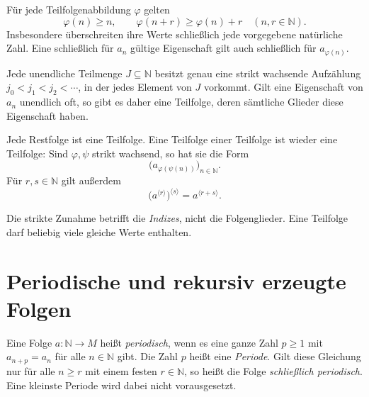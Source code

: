 \begin{theorem}
\label{b21guide:thm:indices}
Für jede Teilfolgenabbildung $\varphi$ gelten
\[
 \varphi(n)\geq n,\qquad
 \varphi(n+r)\geq\varphi(n)+r
 \quad(n,r\in\mathbb N).
\]
Insbesondere überschreiten ihre Werte schließlich jede vorgegebene
natürliche Zahl. Eine schließlich für $a_n$ gültige Eigenschaft
gilt auch schließlich für $a_{\varphi(n)}$.
\end{theorem}

\begin{theorem}
\label{b21guide:thm:enumeration}
Jede unendliche Teilmenge $J\subseteq\mathbb N$ besitzt genau
eine strikt wachsende Aufzählung
$j_0<j_1<j_2<\cdots$, in der jedes Element von $J$ vorkommt.
Gilt eine Eigenschaft von $a_n$ unendlich oft, so gibt es daher
eine Teilfolge, deren sämtliche Glieder diese Eigenschaft haben.
\end{theorem}

\begin{theorem}
Jede Restfolge ist eine Teilfolge. Eine Teilfolge einer Teilfolge
ist wieder eine Teilfolge: Sind $\varphi,\psi$ strikt wachsend,
so hat sie die Form
\[
 \bigl(a_{\varphi(\psi(n))}\bigr)_{n\in\mathbb N}.
\]
Für $r,s\in\mathbb N$ gilt außerdem
\[
 \bigl(a^{\langle r\rangle}\bigr)^{\langle s\rangle}
 =a^{\langle r+s\rangle}.
\]
\end{theorem}

Die strikte Zunahme betrifft die \emph{Indizes}, nicht die
Folgenglieder. Eine Teilfolge darf beliebig viele gleiche Werte
enthalten.

\section{Periodische und rekursiv erzeugte Folgen}

\begin{definition}[Periodizität]
\label{b21guide:def:periodic}
Eine Folge $a\colon\mathbb N\to M$ heißt \emph{periodisch}, wenn es
eine ganze Zahl $p\geq1$ mit $a_{n+p}=a_n$ für alle $n\in\mathbb N$
gibt. Die Zahl $p$ heißt eine \emph{Periode}.
Gilt diese Gleichung nur für alle $n\geq r$ mit einem festen
$r\in\mathbb N$, so heißt die Folge \emph{schließlich periodisch}.
Eine kleinste Periode wird dabei nicht vorausgesetzt.
\end{definition}


